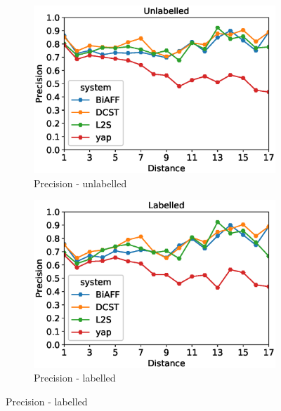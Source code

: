 \documentclass[11pt]{article}
\begin{document}
\begin{figure}[!ht]
        \centering
        \begin{subfigure}[b]{0.475\textwidth}
            \centering
            \includegraphics[width=\textwidth]{images/TestUnlabelledPrecision.eps}
            \caption[Network2]%
            {{\small Precision - unlabelled}}    
            
        \end{subfigure}
        \hfill
        \begin{subfigure}[b]{0.475\textwidth}  
            \centering 
            \includegraphics[width=\textwidth]{images/TestLabelledPrecision.eps}
            \caption[]%
            {{\small Precision - labelled}}    
            

\end{subfigure}
\end{figure}
\end{document}
